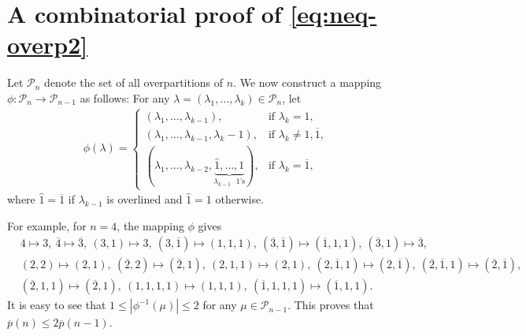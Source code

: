 \documentclass[12pt]{article}
\theoremstyle{remark}
\numberwithin{equation}{section}
\begin{document}
\section{A combinatorial proof of \eqref{eq:neq-overp2}}
Let $\mathscr P_n$ denote the set of all overpartitions of $n$. We now construct a mapping
$\phi\colon \mathscr P_n\to \mathscr P_{n-1}$ as follows: For any
$\lambda=(\lambda_1,\ldots,\lambda_k)\in \mathscr P_n$, let
\begin{align*}
\phi(\lambda)
=\begin{cases}(\lambda_1,\ldots,\lambda_{k-1}), &\text{if $\lambda_k=1$,}\\
(\lambda_1,\ldots,\lambda_{k-1},\lambda_k-1), &\text{if $\lambda_k\neq 1,\overline{1}$,} \\
(\lambda_1, \ldots, \lambda_{k-2}, \underbrace{\hat 1, \ldots, 1}_{\text{$\lambda_{k-1}$ $1$'s}} ),
&\text{if $\lambda_k=\overline{1}$,}
\end{cases}
\end{align*}
where $\hat 1=\overline 1$ if $\lambda_{k-1}$ is overlined and $\hat 1=1$ otherwise.

For example, for $n=4$,  the mapping $\phi$ gives
\begin{align*}
&4\mapsto 3,\ \overline{4}\mapsto\overline{3},\ (3,1)\mapsto 3,
\ (3,\overline{1})\mapsto (1,1,1),\ (\overline{3},\overline{1})\mapsto (\overline{1},1,1),
\ (\overline{3},1)\mapsto \overline{3},
\\
& (2, 2)\mapsto (2, 1),\ (\overline{2}, 2)\mapsto (\overline{2}, 1),
\ (2,1,1)\mapsto (2,1),
\ (2,\overline{1},1)\mapsto (2,\overline{1}),
\ (\overline{2},\overline{1},1)\mapsto (\overline{2},\overline{1}), \\
& (\overline{2},1,1)\mapsto (\overline{2},1),\ (1,1,1,1)\mapsto (1,1,1),
\ (\overline{1},1,1,1)\mapsto (\overline{1},1,1).
\end{align*}
It is easy to see that $1\leqslant |\phi^{-1}(\mu)|\leqslant 2$ for any $\mu\in \mathscr P_{n-1}$.
This proves that $\overline{p}(n)\leqslant 2\overline{p}(n-1)$.
\end{document}

